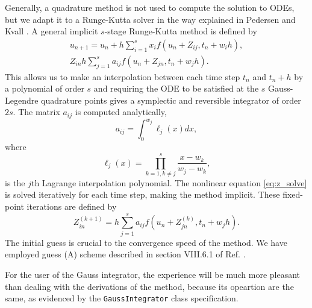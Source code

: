     Generally, a quadrature method is not used to compute the solution to ODEs, but we 
    adapt it to a Runge-Kutta solver in the way explained in 
    Pedersen and Kvall \cite{pedersen2019symplectic}. A general 
    implicit $s$-stage Runge-Kutta method is defined by 
    \begin{align}
        u_{n+1} = u_n + h\sum_{i=1}^s x_i f(u_n + Z_{ij}, t_n + w_i h), \\
        \label{eq:z_solve}
        Z_{in} h\sum_{j=1}^s a_{ij} f(u_n + Z_{jn}, t_n + w_j h).
    \end{align}
    This allows us to make an interpolation between each time step $t_n$ and $t_n + h$
    by a polynomial of order $s$ and requiring the ODE to be satisfied at the $s$
    Gauss-Legendre quadrature points gives a symplectic and reversible integrator of
    order $2s$. The matrix $a_{ij}$ is computed analytically,
    \begin{equation}
        a_{ij} = \int_0^{w_j} \ell_j(x) dx,
    \end{equation}
    where
    \begin{equation}
        \ell_j(x) = \prod_{k=1,k\neq j}^s \frac{x - w_k}{w_j - w_k},
    \end{equation}
    is the $j$th Lagrange interpolation polynomial.
    The nonlinear equation \autoref{eq:z_solve} is solved iteratively for each time
    step, making the method implicit. These fixed-point iterations are defined by 
    \begin{equation}
        Z^{(k+1)}_{in} = h\sum_{j=1}^s a_{ij}f(u_n + Z^{(k)}_{jn}, t_n + w_j h).
    \end{equation}
    The initial guess is crucial to the convergence speed of the method. We have 
    employed guess (A) scheme described in section VIII.6.1 of
    Ref. \cite{hairer2006geometric}.

    For the user of the Gauss integrator, the experience will be much more pleasant 
    than dealing with the derivations of the method, because its opeartion
    are the same, as evidenced by the \lstinline{GaussIntegrator}
    class specification. 